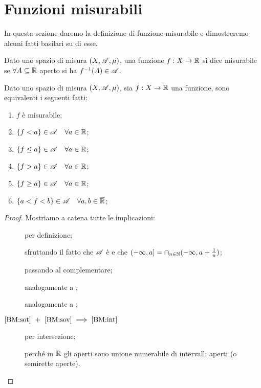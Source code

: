 \section{Funzioni misurabili}

In questa sezione daremo la definizione di funzione misurabile e dimostreremo alcuni fatti basilari su di esse.

\begin{definition}
	Dato uno spazio di misura $(X,\mathscr A,\mu)$, una funzione $f:X\rightarrow \mathbb R$ si dice misurabile se
	$\forall A \subseteq \mathbb R$ aperto si ha $f^{-1}(A)\in \mathscr A$.
\end{definition}

\begin{proposition}
	\label{BasicMis}
	Dato uno spazio di misura $(X,\mathscr A,\mu)$, sia $f:X\rightarrow \mathbb R$ una funzione, sono equivalenti i seguenti fatti:
	\begin{enumerate}[label=(\arabic*),ref=(\arabic*)]
		\item $f$ è misurabile; \label{BM:mis}
		\item $\{f<a\}\in \mathscr A \quad \forall a\in \mathbb R$; \label{BM:sot}
		\item $\{f\leq a\}\in \mathscr A \quad \forall a\in \mathbb R$; \label{BM:soteq}
		\item $\{f>a\}\in \mathscr A \quad \forall a\in \mathbb R$; \label{BM:sov}
		\item $\{f\geq a\}\in \mathscr A \quad \forall a\in \mathbb R$;  \label{BM:soveq}
		\item $\{a<f<b\}\in \mathscr A \quad \forall a,b\in \overline{\mathbb R}$; \label{BM:int}
	\end{enumerate}
\end{proposition}
\begin{proof}
	Mostriamo a catena tutte le implicazioni:
	\begin{description}
	\item[] per definizione;
	\item[] sfruttando il fatto che $\mathscr A$ è \sigalg{} e che
	$(-\infty,a]=\cap_{n\in \mathbb N}(-\infty,a+\frac{1}{n})$;
	\item[] passando al complementare;
	\item[] analogamente a ; 
	\item[] analogamente a ;
	\item[$\text{\ref{BM:sot}}\ +\ \text{\ref{BM:sov}}\implies\text{\ref{BM:int}}$] per intersezione;
	\item[] perché in $\mathbb R$ gli aperti sono unione numerabile di intervalli aperti (o semirette aperte).
	\end{description}
\end{proof}

